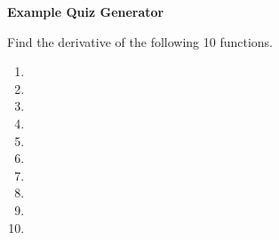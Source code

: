 \documentclass[dvipsnames,12pt]{article}
\begin{document}
\begin{center}
\bf{\Large{Example Quiz Generator}}
\end{center}


\flushleft
\noindent
Find the derivative of the following 10 functions.
\begin{enumerate}

\item

\vspace{30mm}

\item

\vspace{30mm}

\item

\vspace{30mm}

\item

\vspace{30mm}

\item

\vspace{30mm}

\newpage

\item


\vspace{40mm}

\item

\vspace{40mm}

\item

\vspace{40mm}

\item

\vspace{40mm}

\item

\end{enumerate}
\end{document}
